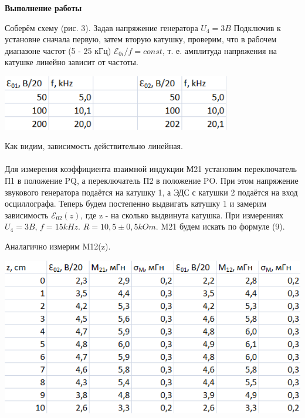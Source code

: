 \documentclass[12pt]{article}
\begin{document}
    \begin{center}
       	\textbf{\large{Выполнение работы}}
    \end{center}
    
    Соберём схему (рис. 3). Задав напряжение генератора $U_4 = 3B$ Подключив к установне сначала первую, затем вторую катушку, проверим, что в рабочем диапазоне частот (5 - 25 кГц) $\mathcal{E}_{0i} / f = const$, т. е. амплитуда напряжения на катушке линейно зависит от частоты.
    
    \begin{center}
    	\includegraphics[width=10cm]{table1.png}
    \end{center}
    
    Как видим, зависимость действительно линейная.\\\\
    
    Для измерения коэффициента взаимной индукции М21 установим переключатель П1 в положение PQ, а переключатель П2 в положение PO. При этом напряжение звукового генератора подаётся на катушку 1, а ЭДС с катушки 2 подаётся на вход осциллографа. Теперь будем постепенно выдвигать катушку 1 и замерим зависимость $\mathcal{E}_{02}(z)$, где z - на сколько выдвинута катушка. При измерениях $U_4=3B$, $f=15kHz$. $R = 10,5 \pm 0,5 kOm$. M21 будем искать по формуле (9).
    
    Аналагично измерим M12(z).
    
    \begin{center}
    	\includegraphics[width=14cm]{table2.png}
    \end{center}
    
\end{document}
